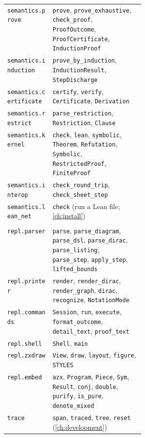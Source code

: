 \begin{xltabular}{\linewidth}{@{}>{\raggedright\arraybackslash}p{0.33\linewidth}X@{}}
\texttt{semantics.prove} & \texttt{prove}, \texttt{prove\_exhaustive}, \texttt{check\_proof}, \texttt{ProofOutcome}, \texttt{ProofCertificate}, \texttt{InductionProof} \\
\texttt{semantics.induction} & \texttt{prove\_by\_induction}, \texttt{InductionResult}, \texttt{StepDischarge} \\
\texttt{semantics.certificate} & \texttt{certify}, \texttt{verify}, \texttt{Certificate}, \texttt{Derivation} \\
\texttt{semantics.restrict} & \texttt{parse\_restriction}, \texttt{Restriction}, \texttt{Clause} \\
\texttt{semantics.kernel} & \texttt{check}, \texttt{lean}, \texttt{symbolic}, \texttt{Theorem}, \texttt{Refutation}, \texttt{Symbolic}, \texttt{RestrictedProof}, \texttt{FiniteProof} \\
\texttt{semantics.interop} & \texttt{check\_round\_trip}, \texttt{check\_sheet\_step} \\
\texttt{semantics.lean\_net} & \texttt{check} (run a Lean file; \cref{ch:install}) \\
 \\
\texttt{repl.parser} & \texttt{parse}, \texttt{parse\_diagram}, \texttt{parse\_dsl}, \texttt{parse\_dirac}, \texttt{parse\_listing}, \texttt{parse\_step}, \texttt{apply\_step}, \texttt{lifted\_bounds} \\
\texttt{repl.printer} & \texttt{render}, \texttt{render\_dirac}, \texttt{render\_graph}, \texttt{dirac}, \texttt{recognize}, \texttt{NotationMode} \\
\texttt{repl.commands} & \texttt{Session}, \texttt{run}, \texttt{execute}, \texttt{format\_outcome}, \texttt{detail\_text}, \texttt{proof\_text} \\
\texttt{repl.shell} & \texttt{Shell}, \texttt{main} \\
\texttt{repl.zxdraw} & \texttt{View}, \texttt{draw}, \texttt{layout}, \texttt{figure}, \texttt{STYLES} \\
\texttt{repl.embed} & \texttt{azx}, \texttt{Program}, \texttt{Piece}, \texttt{Sym}, \texttt{Result}, \texttt{conj}, \texttt{double}, \texttt{purify}, \texttt{is\_pure}, \texttt{denote\_mixed} \\
\texttt{trace} & \texttt{span}, \texttt{traced}, \texttt{tree}, \texttt{reset} (\cref{ch:development}) \\
\end{xltabular}

